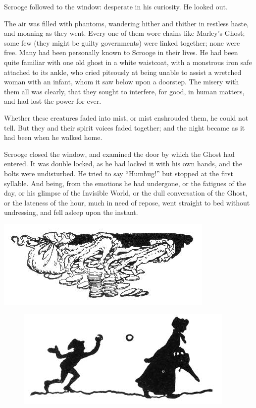 \documentclass[paper=a5,BCOR=15mm,twoside,DIV=15,headinclude=off,12pt,chapterprefix=off,openany,headings=huge]{scrbook} %
\begin{document}
Scrooge followed to the window: desperate in his curiosity. He looked out.

The air was filled with phantoms, wandering hither and thither in restless haste, and moaning as they went. Every one of them wore chains like Marley's Ghost; some few (they might be guilty governments) were linked together; none were free. Many had been personally known to Scrooge in their lives. He had been quite familiar with one old ghost in a white waistcoat, with a monstrous iron safe attached to its ankle, who cried piteously at being unable to assist a wretched woman with an infant, whom it saw below upon a doorstep. The misery with them all was clearly, that they sought to interfere, for good, in human matters, and had lost the power for ever.

Whether these creatures faded into mist, or mist enshrouded them, he could not tell. But they and their spirit voices faded together; and the night became as it had been when he walked home.

Scrooge closed the window, and examined the door by which the Ghost had entered. It was double locked, as he had locked it with his own hands, and the bolts were undisturbed. He tried to say \enquote{Humbug!} but stopped at the first syllable. And being, from the emotions he had undergone, or the fatigues of the day, or his glimpse of the Invisible World, or the dull conversation of the Ghost, or the lateness of the hour, much in need of repose, went straight to bed without undressing, and fell asleep upon the instant.

\begin{minipage}[c]{\linewidth}
\includegraphics[width=\linewidth]{gs053}
\end{minipage}


\begin{figure}[h]
\centering
\includegraphics[width=.5\linewidth]{gs012}
\end{figure}
\end{document}
